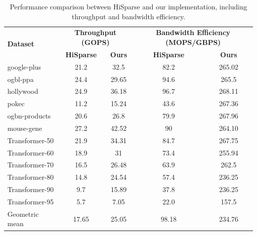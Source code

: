 \documentclass[manuscript,screen,review]{acmart}
\begin{document}
\begin{table}[h!]
	\centering
	\begin{tabular}{|l|c|c|c|c|}
		\hline
		\multirow{2}{*}{\textbf{Dataset}} & \multicolumn{2}{c|}{\textbf{Throughput (GOPS)}} & \multicolumn{2}{c|}{\textbf{Bandwidth Efficiency (MOPS/GBPS)}} \\
		\cline{2-5}
		& \textbf{HiSparse} & \textbf{Ours} & \textbf{HiSparse} & \textbf{Ours} \\
		\hline
		google-plus & 21.2 & 32.5 & 82.2 & 265.02 \\
		ogbl-ppa & 24.4 & 29.65 & 94.6 & 265.5 \\
		hollywood & 24.9 & 36.18 & 96.7 & 268.11 \\
		pokec & 11.2 & 15.24 & 43.6 & 267.36 \\
		ogbn-products & 20.6 & 26.8 & 79.9 & 267.96 \\
		mouse-gene & 27.2 & 42.52 & 90 & 264.10 \\
		Transformer-50 & 21.9 & 34.31 & 84.7 & 267.75 \\
		Transformer-60 & 18.9 & 31 & 73.4 & 255.94 \\		
		Transformer-70 & 16.5 & 26.48 & 63.9 & 262.5 \\
		
		Transformer-80 & 14.8 & 24.54 & 57.4 & 236.25 \\

		Transformer-90 & 9.7 & 15.89 & 37.8 & 236.25 \\

		
		Transformer-95 & 5.7 & 7.05 & 22.0 & 157.5 \\
		\hline
		Geometric mean & 17.65 & 25.05 & 98.18 & 234.76 \\
		\hline
	\end{tabular}
	\caption{Performance comparison between HiSparse and our implementation, including throughput and bandwidth efficiency.}
\end{table}
\end{document}
